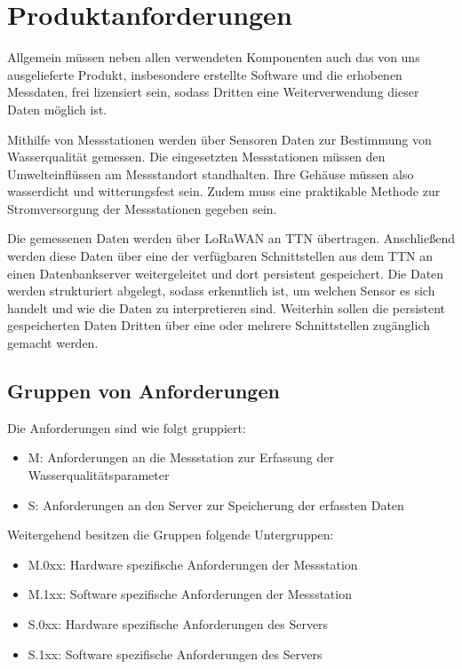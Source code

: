 \section{Produktanforderungen}

Allgemein müssen neben allen verwendeten Komponenten auch das von uns ausgelieferte
Produkt, insbesondere erstellte Software und die erhobenen Messdaten, frei lizensiert
sein, sodass Dritten eine Weiterverwendung dieser Daten möglich ist.

Mithilfe von Messstationen werden über Sensoren Daten zur Bestimmung von Wasserqualität
gemessen. Die eingesetzten Messstationen müssen den Umwelteinflüssen am Messstandort
standhalten. Ihre Gehäuse müssen also wasserdicht und witterungsfest sein. Zudem muss
eine praktikable Methode zur Stromversorgung der Messstationen gegeben sein.

Die gemessenen Daten werden über LoRaWAN an TTN übertragen. Anschließend werden diese
Daten über eine der verfügbaren Schnittstellen aus dem TTN an einen Datenbankserver
weitergeleitet und dort persistent gespeichert. Die Daten werden strukturiert abgelegt,
sodass erkenntlich ist, um welchen Sensor es sich handelt und wie die Daten zu
interpretieren sind. Weiterhin sollen die persistent gespeicherten Daten Dritten über
eine oder mehrere Schnittstellen zugänglich gemacht werden.

\subsection{Gruppen von Anforderungen}

Die Anforderungen sind wie folgt gruppiert:
\begin{itemize}
	\item M: Anforderungen an die Messstation zur Erfassung der Wasserqualitätsparameter
	\item S: Anforderungen an den Server zur Speicherung der erfassten Daten
\end{itemize}

Weitergehend besitzen die Gruppen folgende Untergruppen:
\begin{itemize}
	\item M.0xx: Hardware spezifische Anforderungen der Messstation
	\item M.1xx: Software spezifische Anforderungen der Messstation
	\item S.0xx: Hardware spezifische Anforderungen des Servers
	\item S.1xx: Software spezifische Anforderungen des Servers
\end{itemize}

